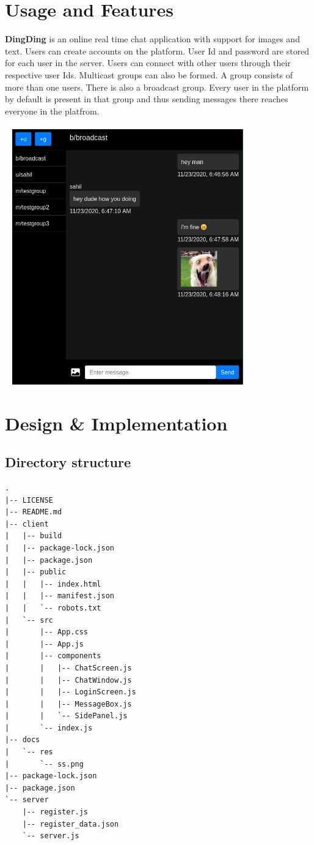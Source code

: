\documentclass[titlepage]{article}
\begin{document}
    \section{Usage and Features}
    \textbf{DingDing} is an online real time chat application with support for images and text.
    Users can create accounts on the platform. User Id and password are stored for each user in the server.
    Users can connect with other users through their respective user Ids. Multicast groups can also be formed.
    A group consists of more than one users. There is also a broadcast group. Every user in the platform by default
    is present in that group and thus sending messages there reaches everyone in the platfrom.
    \\~
    \\~
    \includegraphics[width=10cm]{./ss.png}

    \section{Design \& Implementation}
    
    \subsection{Directory structure}
    \begin{verbatim}
.
|-- LICENSE
|-- README.md
|-- client
|   |-- build
|   |-- package-lock.json
|   |-- package.json
|   |-- public
|   |   |-- index.html
|   |   |-- manifest.json
|   |   `-- robots.txt
|   `-- src
|       |-- App.css
|       |-- App.js
|       |-- components
|       |   |-- ChatScreen.js
|       |   |-- ChatWindow.js
|       |   |-- LoginScreen.js
|       |   |-- MessageBox.js
|       |   `-- SidePanel.js
|       `-- index.js
|-- docs
|   `-- res
|       `-- ss.png
|-- package-lock.json
|-- package.json
`-- server
    |-- register.js
    |-- register_data.json
    `-- server.js
    \end{verbatim}
\end{document}
